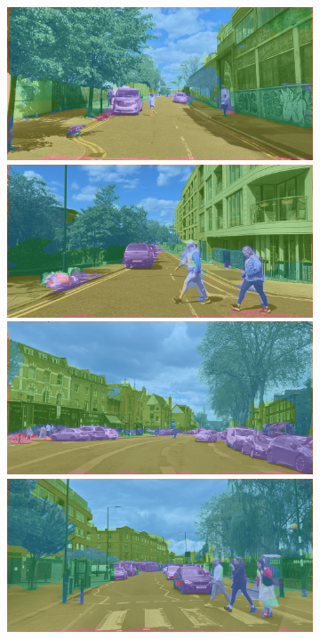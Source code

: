 \begin{figure}[H]
\begin{subfigure}[t]{.32\textwidth}
		\includegraphics[width=\textwidth]{city_images/HackneyScapes/Hackney3164_swin2_no_background.png} \\[5pt]
		\includegraphics[width=\textwidth]{city_images/HackneyScapes/Hackney3173_swin2_no_background.png} \\[5pt]
		\includegraphics[width=\textwidth]{city_images/HackneyScapes/Hackney3204_swin2_no_background.png} \\[5pt]
		\includegraphics[width=\textwidth]{city_images/HackneyScapes/Hackney3210_swin2_no_background.png}


\end{subfigure}
\end{figure}
